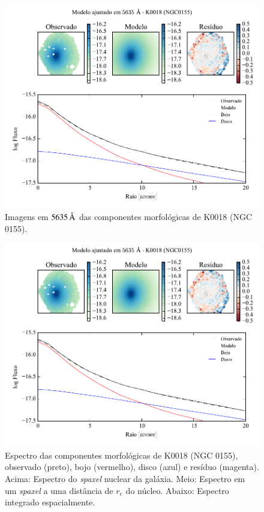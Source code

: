 \begin{figure}
	\includegraphics[page=3]{figuras-decomp/K0018_sample006a}
	\caption[Imagens em $5635\,\angstrom$ das componentes morfológicas de K0018
	(NGC 0155)]
	{Imagens em $5635\,\angstrom$ das componentes morfológicas de K0018
	(NGC 0155).}
	\label{fig:decompImages:K0018}
\end{figure}

\begin{figure}
	\includegraphics[page=4]{figuras-decomp/K0018_sample006a}
	\caption[Espectro das componentes morfológicas de K0018 (NGC 0155)]
	{Espectro das componentes morfológicas de K0018 (NGC 0155),
	observado (preto), bojo (vermelho), disco (azul) e resíduo (magenta). Acima:
	Espectro do {\em spaxel} nuclear da galáxia. Meio: Espectro em um {\em spaxel}
	a uma distância de $r_e$ do núcleo. Abaixo: Espectro integrado espacialmente.}
	\label{fig:decompSpectra:K0018}
\end{figure}

